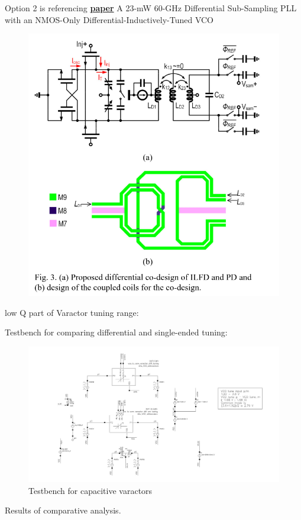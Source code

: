 Option 2 is referencing \href{https://ieeexplore.ieee.org/document/9056968}{\textbf{paper}} A 23-mW 60-GHz Differential Sub-Sampling PLL with an NMOS-Only Differential-Inductively-Tuned VCO
\begin{figure}[ht!]
	\centering
	\includegraphics[width=0.5\linewidth]{Figures/diff-var2.png}
	\label{fig:diff-var2}
\end{figure}

low Q part of Varactor tuning range: %

Testbench for comparing differential and single-ended tuning:

\begin{figure}[ht!]
	\centering
	\includegraphics[width=\linewidth]{Figures/cvar-testbench.jpg}
	\caption{Testbench for capacitive varactors}
	\label{fig:cvar-testbench}
\end{figure}

Results of comparative analysis.

